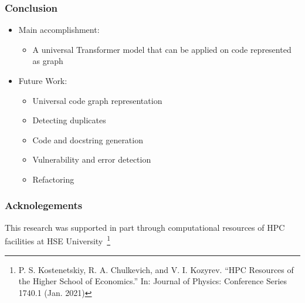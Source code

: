 \documentclass[aspectratio=169]{beamer}
\begin{document}
    \begin{frame}
        \frametitle{Conclusion}
        \begin{itemize}
            \item Main accomplishment:
            \begin{itemize}
                \item A universal Transformer model that can be applied on code represented as graph
            \end{itemize}
            \item Future Work:
            \begin{itemize}
                \item Universal code graph representation
                \item Detecting duplicates
                \item Code and docstring generation
                \item Vulnerability and error detection
                \item Refactoring
            \end{itemize}
        \end{itemize}
    \end{frame}

    \begin{frame}
        \frametitle{Acknolegements}
        This research was supported in part through computational resources of HPC facilities at HSE University~\footnote{
            P. S. Kostenetskiy, R. A. Chulkevich, and V. I. Kozyrev. “HPC Resources of the Higher School of Economics.” In: Journal of Physics: Conference Series 1740.1 (Jan. 2021)
        }
    \end{frame}
\end{document}
